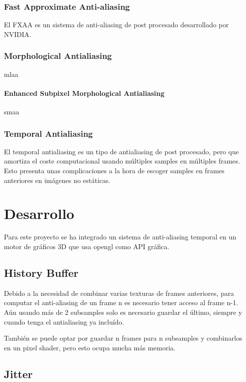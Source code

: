 \documentclass[withindex, glossary]{cam-thesis}
\begin{document}
\subsection{Fast Approximate Anti-aliasing}

El FXAA\cite{FXAA} es un sistema de anti-aliasing de post procesado desarrollado por NVIDIA\@.

\subsection{Morphological Antialiasing}
mlaa

\subsubsection{Enhanced Subpixel Morphological Antialiasing}
smaa

\subsection{Temporal Antialiasing}

El temporal antialiasing es un tipo de antialiasing de post procesado, pero que amortiza el coste computacional usando múltiples samples en múltiples frames. Esto presenta unas complicaciones a la hora de escoger samples en frames anteriores en imágenes no estáticas.

\chapter{Desarrollo}

Para este proyecto se ha integrado un sistema de anti-aliasing temporal en un motor de gráficos 3D que usa \Gls{opengl} como API gráfica.

\section{History Buffer}

Debido a la necesidad de combinar varias texturas de frames anteriores, para computar el anti-aliasing de un frame n es necesario tener acceso al frame n-1. Aún usando más de 2 subsamples solo es necesario guardar el último, siempre y cuando tenga el antialiasing ya incluído.

También se puede optar por guardar n frames para n subsamples y combinarlos en un pixel shader, pero esto ocupa mucha más memoria.

\section{Jitter}
\end{document}
